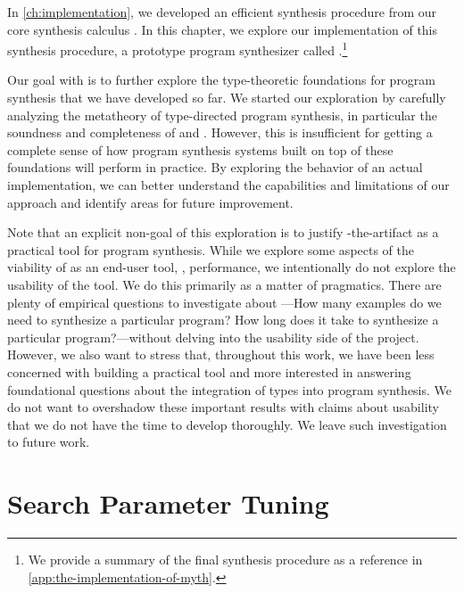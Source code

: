 In \autoref{ch:implementation}, we developed an efficient synthesis procedure from our core synthesis calculus \mlsyn{}.
In this chapter, we explore our implementation of this synthesis procedure, a prototype program synthesizer called \myth{}.\footnote{%
  We provide a summary of the final synthesis procedure as a reference in \autoref{app:the-implementation-of-myth}.
}

Our goal with \myth{} is to further explore the type-theoretic foundations for program synthesis that we have developed so far.
We started our exploration by carefully analyzing the metatheory of type-directed program synthesis, in particular the soundness and completeness of \lsyn{} and \mlsyn{}.
However, this is insufficient for getting a complete sense of how program synthesis systems built on top of these foundations will perform in practice.
By exploring the behavior of an actual implementation, we can better understand the capabilities and limitations of our approach and identify areas for future improvement.

Note that an explicit non-goal of this exploration is to justify \myth{}-the-artifact as a practical tool for program synthesis.
While we explore some aspects of the viability of \myth{} as an end-user tool, \eg, performance, we intentionally do not explore the usability of the tool.
We do this primarily as a matter of pragmatics.
There are plenty of empirical questions to investigate about \myth{}---How many examples do we need to synthesize a particular program?  How long does it take to synthesize a particular program?---without delving into the usability side of the project.
However, we also want to stress that, throughout this work, we have been less concerned with building a practical tool and more interested in answering foundational questions about the integration of types into program synthesis.
We do not want to overshadow these important results with claims about usability that we do not have the time to develop thoroughly.
We leave such investigation to future work.

\section{Search Parameter Tuning}
\label{sec:search-parameter-tuning}

